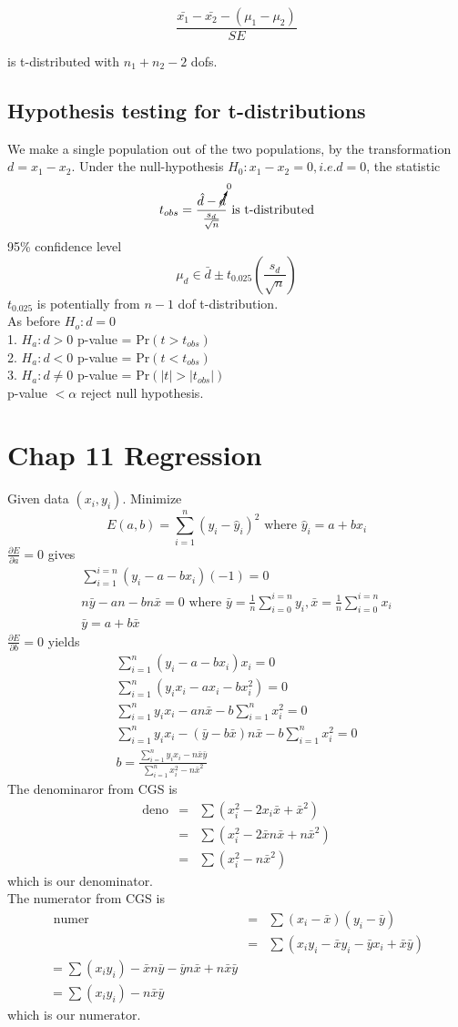 \documentclass{article}
\newcommand{\beq}{\begin{equation}}
\newcommand{\eeq}{\end{equation}}
\newcommand{\ber}{\begin{eqnarray}}
\newcommand{\eer}{\end{eqnarray}}
\newcommand{\pdd}[2]{\frac{\partial{#1}}{\partial{#2}}}
\begin{document}
\beq
\frac{\bar{x_1}-\bar{x_2}-(\mu_1-\mu_2)}{SE}
\eeq

is t-distributed with $n_1+n_2-2$ dofs.


\subsection{Hypothesis testing for t-distributions}
We make a single population out of the two populations, by the transformation
$d=x_1-x_2$. Under the null-hypothesis $H_0:x_1-x_2=0, i.e. d = 0$, the statistic
\beq
t_{obs} = \frac{\hat{d}-\cancelto{0}{d}}{\frac{s_d}{\sqrt{n}}} \text{ is t-distributed}
\eeq
95\% confidence level
\beq
\mu_d \in \bar{d} \pm t_{0.025}(\frac{s_d}{\sqrt{n}})
\eeq
$t_{0.025}$ is potentially from $n-1$ dof t-distribution.\\
As before $H_o: d=0$\\
1. $H_a:d>0$ p-value = Pr$(t>t_{obs})$\\
2. $H_a:d<0$ p-value = Pr$(t<t_{obs})$\\
3. $H_a:d\ne{0}$ p-value = Pr$(|t|>|t_{obs}|)$\\
p-value $<\alpha$ reject null hypothesis.
\section{Chap 11 Regression}
Given data $(x_i,y_i)$. Minimize
\beq
E(a,b) = \sum_{i=1}^{n}(y_i - \hat{y}_i)^2 \text{ where } \hat{y}_i = a +bx_i
\eeq
$\pdd{E}{a}=0$ gives
\ber
\sum_{i=1}^{i=n}(y_i-a-bx_i)(-1) = 0 \\
n\bar{y} - an -bn\bar{x} = 0 \text{ where } \bar{y} = \frac{1}{n}\sum_{i=0}^{i=n}y_i, \bar{x} = \frac{1}{n}\sum_{i=0}^{i=n}x_i \\
\bar{y} = a + b\bar{x}  
\eer
$\pdd{E}{b}=0$ yields
\ber
\sum_{i=1}^{n}(y_i - a - bx_i)x_i = 0 \\
\sum_{i=1}^{n}(y_ix_i - ax_i -bx_i^2) = 0\\
\sum_{i=1}^{n}y_ix_i - an\bar{x} - b\sum_{i=1}^n x_i^2 = 0\\
\sum_{i=1}^{n}y_ix_i - ( \bar{y} - b\bar{x})n\bar{x} - b\sum_{i=1}^n x_i^2=0\\
b = \frac{\sum_{i=1}^{n}y_ix_i-n\bar{x}\bar{y}}{\sum_{i=1}^{n}x_i^2- n\bar{x}^2}
\eer
The denominaror from CGS is
\ber
\text{deno} &=& \sum( x_i^2 - 2x_i\bar{x} + \bar{x}^2) \\
&=& \sum ( x_i^2 - 2\bar{x}n\bar{x} + n\bar{x}^2) \\
&=& \sum ( x_i^2 - n\bar{x}^2)
\eer
which is our denominator.\\
The numerator from CGS is
\ber
\text{ numer } &=& \sum(x_i-\bar{x})(y_i-\bar{y})\\
&=& \sum(x_iy_i - \bar{x}y_i -\bar{y}x_i + \bar{x}\bar{y})\\
=\sum(x_iy_i) - \bar{x}n\bar{y}  - \bar{y}n\bar{x} + n\bar{x}\bar{y} \\
=\sum(x_iy_i) - n\bar{x}\bar{y}
\eer
which is our numerator.
\end{document}

